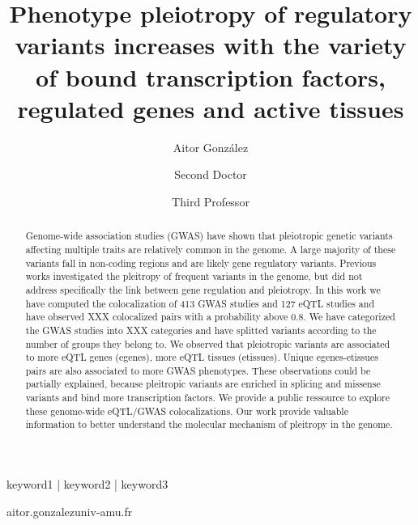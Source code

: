 
\title{Phenotype pleiotropy of regulatory variants increases with the variety of bound transcription factors, regulated genes and active tissues}
	
\author[1,\Letter]{Aitor González }
\author[2]{Second Doctor }
\author[1]{Third Professor }
\date{}

\maketitle

\begin{abstract}

Genome-wide association studies (GWAS) have shown that pleiotropic genetic variants affecting multiple traits are relatively common in the genome.
A large majority of these variants fall in non-coding regions and are likely gene regulatory variants.
Previous works investigated the pleitropy of frequent variants in the genome, but did not address specifically the link between gene regulation and pleiotropy.
%
In this work we have computed the colocalization of 413 GWAS studies and 127 eQTL studies and have observed XXX colocalized pairs with a probability above 0.8.
We have categorized the GWAS studies into XXX categories and have splitted variants according to the number of groups they belong to.
We observed that pleiotropic variants are associated to more eQTL genes (egenes), more eQTL tissues (etissues).
Unique egenes-etissues pairs are also associated to more GWAS phenotypes.
These observations could be partially explained, because pleitropic variants are enriched in splicing and missense variants and bind more transcription factors.
We provide a public ressource to explore these genome-wide eQTL/GWAS colocalizations.
%
Our work provide valuable information to better understand the molecular mechanism of pleitropy in the genome.


\lipsum[1][1]
\end{abstract}

\begin{keywords}
keyword1 | keyword2 | keyword3
\end{keywords}

\begin{corrauthor}
aitor.gonzalez\at univ-amu.fr
\end{corrauthor}

